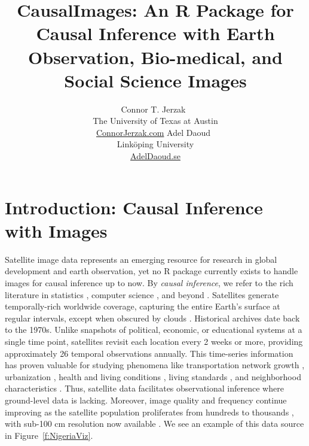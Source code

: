 \documentclass[nojss,shortnames]{jss} %
\author{
Connor T. Jerzak~\orcidlink{0000-0003-1914-8905}
\\ The University of Texas at Austin
\\  \url{ConnorJerzak.com}
%
   \And 
%
Adel Daoud~\orcidlink{0000-0001-7478-8345}
\\  Link\"oping University
\\ \url{AdelDaoud.se}
}
\title{ CausalImages: An R Package for Causal Inference with Earth Observation, Bio-medical, and Social Science Images}
\begin{document}



\section{Introduction: Causal Inference with Images}\label{s:Intro}

Satellite image data represents an emerging resource for research in global development and earth observation, yet no R package currently exists to handle images for causal inference up to now. By \textit{causal inference}, we refer to the rich literature in statistics \citep{imbens2016causal}, computer science \citep{pearl_causality_2009}, and beyond \citep{hernan_causal_2020}.  Satellites generate temporally-rich worldwide coverage, capturing the entire Earth's surface at regular intervals, except when obscured by clouds \citep{burke_using_2021}. Historical archives date back to the 1970s. Unlike snapshots of political, economic, or educational systems at a single time point, satellites revisit each location every 2 weeks or more, providing approximately 26 temporal observations annually. This time-series information has proven valuable for studying phenomena like transportation network growth \citep{nagne2013transportation}, urbanization \citep{schneider2009new}, health and living conditions \citep{daoud_using_2023,chi_microestimates_2022}, living standards \citep{yeh2020using,ijcai2023p684}, and neighborhood characteristics \citep{sowmya2000modelling}. Thus, satellite data facilitates observational inference where ground-level data is lacking. Moreover, image quality and frequency continue improving as the satellite population proliferates from hundreds to thousands \citep{tatem2008fifty}, with sub-100 cm resolution now available \citep{hallas2019mapping}. We see an example of this data source in Figure~\ref{f:NigeriaViz}.
\end{document}
